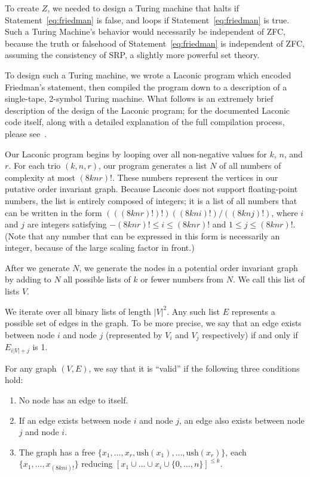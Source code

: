 \documentclass[11pt]{article}
\begin{document}
To create $Z$, we needed to design a Turing machine that halts if Statement~\ref{eq:friedman} is false, and loops if Statement~\ref{eq:friedman} is true. Such a Turing Machine's behavior would necessarily be independent of ZFC, because the truth or falsehood of Statement~\ref{eq:friedman} is independent of ZFC, assuming the consistency of SRP, a slightly more powerful set theory.~\cite{friedman} 

To design such a Turing machine, we wrote a Laconic program which encoded Friedman's statement, then compiled the program down to a description of a single-tape, 2-symbol Turing machine. What follows is an extremely brief description of the design of the Laconic program; for the documented Laconic code itself, along with a detailed explanation of the full compilation process, please see~\cite{github}. 

Our Laconic program begins by looping over all non-negative values for $k$, $n$, and $r$. For each trio $(k, n, r)$, our program generates a list $N$ of all numbers of complexity at most $(8knr)!$. These numbers represent the vertices in our putative order invariant graph. Because Laconic does not support floating-point numbers, the list is entirely composed of integers; it is a list of all numbers that can be written in the form $(((8knr)!)!)((8kni)!)/((8knj)!)$, where $i$ and $j$ are integers satisfying $-(8knr)! \le i \le (8knr)!$ and $1 \le j \le (8knr)!$. (Note that any number that can be expressed in this form is necessarily an integer, because of the large scaling factor in front.) 

After we generate $N$, we generate the nodes in a potential order invariant graph by adding to $N$ all possible lists of $k$ or fewer numbers from $N$. We call this list of lists $V$. 

We iterate over all binary lists of length $|V|^2$. Any such list $E$ represents a possible set of edges in the graph. To be more precise, we say that an edge exists between node $i$ and node $j$ (represented by $V_i$ and $V_j$ respectively) if and only if $E_{i|V| + j}$ is 1. 

For any graph $(V, E)$, we say that it is ``valid'' if the following three conditions hold:

\begin{enumerate}

\item No node has an edge to itself.
\item If an edge exists between node $i$ and node $j$, an edge also exists between node $j$ and node $i$.
\item The graph has a free $\{x_1,\dots,x_r, \textrm{ush}(x_1),...,\textrm{ush}(x_r)\}$, each  $\{x_1, \dots, x_{(8kni)!}\}$ reducing $[x_1 \cup \dots \cup x_i \cup \{0,\dots,n\}]^{\le k}$.

\end{enumerate}
\end{document}

